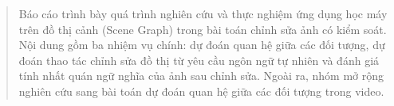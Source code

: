 

\begin{abstract}
Báo cáo trình bày quá trình nghiên cứu và thực nghiệm ứng dụng học máy trên đồ thị cảnh (Scene Graph)
trong bài toán chỉnh sửa ảnh có kiểm soát.
Nội dung gồm ba nhiệm vụ chính: dự đoán quan hệ giữa các đối tượng,
dự đoán thao tác chỉnh sửa đồ thị từ yêu cầu ngôn ngữ tự nhiên và đánh giá tính nhất quán ngữ nghĩa của ảnh sau chỉnh sửa.
Ngoài ra, nhóm mở rộng nghiên cứu sang bài toán dự đoán quan hệ giữa các đối tượng trong video.
\end{abstract}
